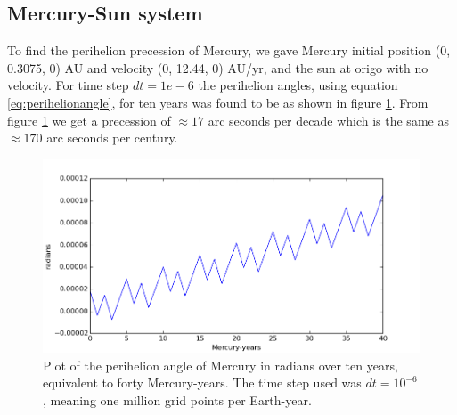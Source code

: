 \documentclass[norsk,a4paper,12pt]{article}
\begin{document}
{\subsection{Mercury-Sun system}
To find the perihelion precession of Mercury, we gave Mercury initial position (0, 0.3075, 0) AU and velocity (0, 12.44, 0) AU/yr, and the sun at origo with no velocity. For time step $dt=1e-6$ the perihelion angles, using equation \ref{eq:perihelionangle}, for ten years was found to be as shown in figure \ref{fig:precesion}. From figure \ref{fig:precesion} we get a precession of $\approx 17$ arc seconds per decade which is the same as $\approx 170$ arc seconds per century.
\begin{figure}
\centering
\includegraphics[scale=0.7]{precesion.png}
\caption{Plot of the perihelion angle of Mercury in radians over ten years, equivalent to forty Mercury-years. The time step used was $dt=10^{-6}$, meaning one million grid points per Earth-year.}
\label{fig:precesion}
\end{figure}

}
\end{document}
